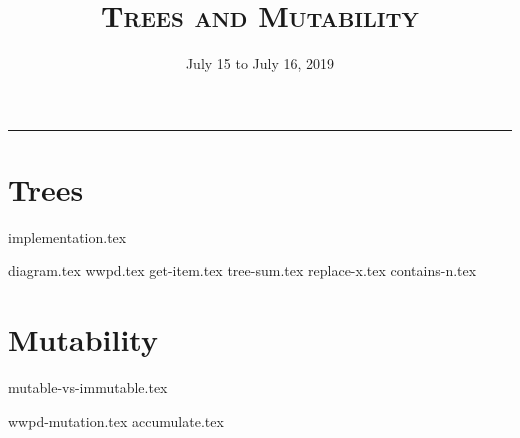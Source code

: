 \documentclass{exam}
\title{\textsc{Trees and Mutability}}
\date{July 15 to July 16, 2019}
\begin{document}
\maketitle
\rule{\textwidth}{0.15em}
\fontsize{12}{15}\selectfont

\section{Trees}
{implementation.tex}
\newpage
\begin{questions}
{diagram.tex}
{wwpd.tex}
\vspace{2\baselineskip}
{get-item.tex}
{tree-sum.tex}
{replace-x.tex}
{contains-n.tex}
\end{questions}

\section{Mutability}
{mutable-vs-immutable.tex}
\newpage
\begin{questions}
{wwpd-mutation.tex}
\newpage
{accumulate.tex}
\end{questions}
\end{document}

